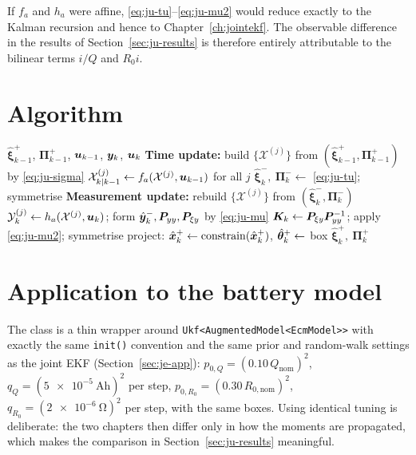 \begin{remark}
If $f_a$ and $h_a$ were affine, \eqref{eq:ju-tu}--\eqref{eq:ju-mu2} would reduce exactly to the
Kalman recursion and hence to Chapter~\ref{ch:jointekf}.  The observable difference in the results
of Section~\ref{sec:ju-results} is therefore entirely attributable to the bilinear terms $i/Q$ and
$R_0 i$.
\end{remark}

\section{Algorithm}
\begin{algorithm}[H]
\caption{Joint SPKF --- one sampling period}
\begin{algorithmic}[1]
\Require $\hat{\bm{\xi}}^+_{k-1}$, $\bm{\Pi}^+_{k-1}$, $\bm{u}_{k-1}$, $\bm{y}_k$, $\bm{u}_k$
\State \textbf{Time update:} build $\{\mathcal{X}^{(j)}\}$ from $(\hat{\bm{\xi}}^+_{k-1},\bm{\Pi}^+_{k-1})$ by \eqref{eq:ju-sigma}
\State $\mathcal{X}^{(j)}_{k|k-1}\gets f_a(\mathcal{X}^{(j)},\bm{u}_{k-1})$ for all $j$ 
\State $\hat{\bm{\xi}}^-_k,\ \bm{\Pi}^-_k \gets$ \eqref{eq:ju-tu}; symmetrise
\State \textbf{Measurement update:} rebuild $\{\mathcal{X}^{(j)}\}$ from $(\hat{\bm{\xi}}^-_k,\bm{\Pi}^-_k)$
\State $\mathcal{Y}^{(j)}_k\gets h_a(\mathcal{X}^{(j)},\bm{u}_k)$; form $\hat{\bm{y}}^-_k,\bm{P}_{yy},\bm{P}_{\xi y}$ by \eqref{eq:ju-mu}
\State $\bm{K}_k\gets\bm{P}_{\xi y}\bm{P}_{yy}^{-1}$; apply \eqref{eq:ju-mu2}; symmetrise
\State project: $\hat{\bm{x}}^{+}_k\gets\mathrm{constrain}(\hat{\bm{x}}^{+}_k)$, $\hat{\bm{\theta}}^+_k\gets$ box
\Ensure $\hat{\bm{\xi}}^+_k,\ \bm{\Pi}^+_k$
\end{algorithmic}
\end{algorithm}

\section{Application to the battery model}
The class is a thin wrapper around \texttt{Ukf<AugmentedModel<EcmModel>{}>} with exactly the same
\texttt{init()} convention and the same prior and random-walk settings as the joint EKF
(Section~\ref{sec:je-app}): $p_{0,Q}=(0.10\,Q_\text{nom})^2$, $q_Q=(\SI{5e-5}{\ampere\hour})^2$ per
step, $p_{0,R_0}=(0.30\,R_{0,\text{nom}})^2$, $q_{R_0}=(\SI{2e-6}{\ohm})^2$ per step, with the same
boxes.  Using identical tuning is deliberate: the two chapters then differ only in how the moments
are propagated, which makes the comparison in Section~\ref{sec:ju-results} meaningful.

